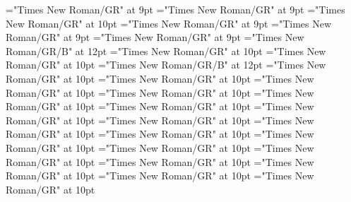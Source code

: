 \documentclass[gps1,twoside]{article}
\begin{document}
\font\spanspanpicturessubentrysubentriesentrybefore="Times New Roman/GR" at 9pt
\font\picturessubentrysubentriesentryafter="Times New Roman/GR" at 9pt
\font\picturepicturessubentrysubentriesentry="Times New Roman/GR" at 10pt
\font\picturepicturessubentrysubentriesentryafter="Times New Roman/GR" at 9pt
\font\spanspancaptionpicturepicturessubentrysubentriesentrybefore="Times New Roman/GR" at 9pt
\font\subentriessubentrysubentriesentryafter="Times New Roman/GR" at 9pt
\font\spanbzhheadwordminorentrycomplex="Times New Roman/GR/B" at 12pt
\font\spanspanheadwordminorentrycomplexbefore="Times New Roman/GR" at 10pt
\font\spanheadwordminorentrycomplexlastchildafter="Times New Roman/GR" at 10pt
\font\spanheadwordminorentrycomplex="Times New Roman/GR/B" at 12pt
\font\pronunciationpronunciationpronunciationsminorentrycomplexbefore="Times New Roman/GR" at 10pt
\font\pronunciationsminorentrycomplexafter="Times New Roman/GR" at 10pt
\font\spanspanformpronunciationpronunciationsminorentrycomplexbefore="Times New Roman/GR" at 10pt
\font\spanformpronunciationpronunciationsminorentrycomplexfirstchildbefore="Times New Roman/GR" at 10pt
\font\spanformpronunciationpronunciationsminorentrycomplexlastchildafter="Times New Roman/GR" at 10pt
\font\spanspanvariantformentrybackrefsminorentrycomplexbefore="Times New Roman/GR" at 10pt
\font\variantformentrybackrefsminorentrycomplexbefore="Times New Roman/GR" at 10pt
\font\variantformentrybackrefsminorentrycomplexafter="Times New Roman/GR" at 10pt
\font\variantentrytypevariantentrytypevariantentrytypesvariantformentrybackrefvariantformentrybackrefsminorentrycomplexbefore="Times New Roman/GR" at 10pt
\font\variantentrytypesvariantformentrybackrefvariantformentrybackrefsminorentrycomplexafter="Times New Roman/GR" at 10pt
\font\spanspanreverseabbrvariantentrytypevariantentrytypesvariantformentrybackrefvariantformentrybackrefsminorentrycomplexbefore="Times New Roman/GR" at 10pt
\font\spanreverseabbrvariantentrytypevariantentrytypesvariantformentrybackrefvariantformentrybackrefsminorentrycomplexlastchildafter="Times New Roman/GR" at 10pt
\font\spanspanheadwordvariantformentrybackrefvariantformentrybackrefsminorentrycomplexbefore="Times New Roman/GR" at 10pt
\font\spanspanowningentrysummarydefinitionvariantformentrybackrefvariantformentrybackrefsminorentrycomplexbefore="Times New Roman/GR" at 10pt
\font\spanowningentrysummarydefinitionvariantformentrybackrefvariantformentrybackrefsminorentrycomplexlastchildafter="Times New Roman/GR" at 10pt
\font\spanspanvisiblevariantentryrefsminorentrycomplexbefore="Times New Roman/GR" at 10pt
\font\visiblevariantentryrefsminorentrycomplexafter="Times New Roman/GR" at 10pt
\end{document}
